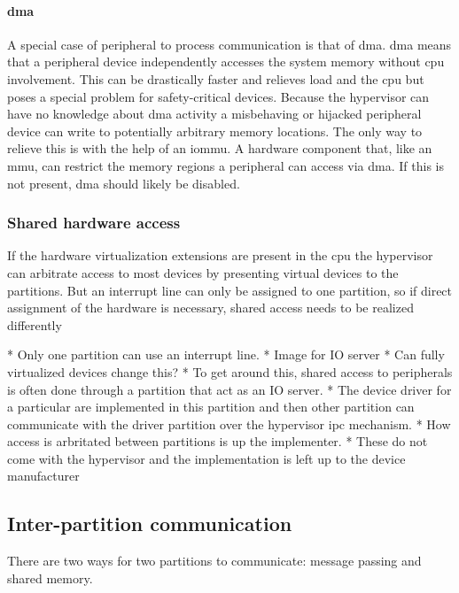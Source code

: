 \paragraph{\acrshort{dma}}
A special case of peripheral to process communication is that of \acrfull{dma}. \acrshort{dma} means that a peripheral device independently accesses the system memory without \acrshort{cpu} involvement. This can be drastically faster and relieves load and the \acrshort{cpu} but poses a special problem for safety-critical devices. Because the hypervisor can have no knowledge about \acrshort{dma} activity a misbehaving or hijacked peripheral device can write to potentially arbitrary memory locations. The only way to relieve this is with the help of an \acrfull{iommu}. A hardware component that, like an \acrshort{mmu}, can restrict the memory regions a peripheral can access via \acrshort{dma}.
If this is not present, \acrshort{dma} should likely be disabled.

\subsubsection{Shared hardware access}
If the hardware virtualization extensions are present in the \acrshort{cpu} the hypervisor can arbitrate access to most devices by presenting virtual devices to the partitions.
But an interrupt line can only be assigned to one partition, so if direct assignment of the hardware is necessary, shared access needs to be realized differently 


* Only one partition can use an interrupt line. 
* Image for IO server
* Can fully virtualized devices change this?
* To get around this, shared access to peripherals is often done through a partition that act as an IO server.
* The device driver for a particular are implemented in this partition and then other partition can communicate with the driver partition over the hypervisor \acrshort{ipc} mechanism.
* How access is arbritated between partitions is up the implementer.
* These do not come with the hypervisor and the implementation is left up to the device manufacturer
\subsection{Inter-partition communication}
There are two ways for two partitions to communicate: message passing and shared memory.

